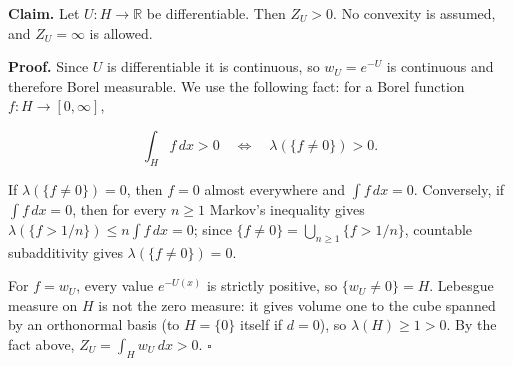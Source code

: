 \documentclass[11pt,a4paper]{article}
\begin{document}
\textbf{Claim.} Let \(U:H\to\mathbb R\) be differentiable. Then \(Z_U>0\). No convexity is assumed, and \(Z_U=\infty\) is allowed.




\textbf{Proof.} Since \(U\) is differentiable it is continuous, so \(w_U=e^{-U}\) is continuous and therefore Borel measurable. We use the following fact: for a Borel function \(f:H\to[0,\infty]\),


\[\int_Hf\,dx>0\quad\Longleftrightarrow\quad\lambda(\{f\ne0\})>0.\]


If \(\lambda(\{f\ne0\})=0\), then \(f=0\) almost everywhere and \(\int f\,dx=0\). Conversely, if \(\int f\,dx=0\), then for every \(n\ge1\) Markov's inequality gives \(\lambda(\{f>1/n\})\le n\int f\,dx=0\); since \(\{f\ne0\}=\bigcup_{n\ge1}\{f>1/n\}\), countable subadditivity gives \(\lambda(\{f\ne0\})=0\).




For \(f=w_U\), every value \(e^{-U(x)}\) is strictly positive, so \(\{w_U\ne0\}=H\). Lebesgue measure on \(H\) is not the zero measure: it gives volume one to the cube spanned by an orthonormal basis (to \(H=\{0\}\) itself if \(d=0\)), so \(\lambda(H)\ge1>0\). By the fact above, \(Z_U=\int_Hw_U\,dx>0\). \(\square\)
\end{document}
